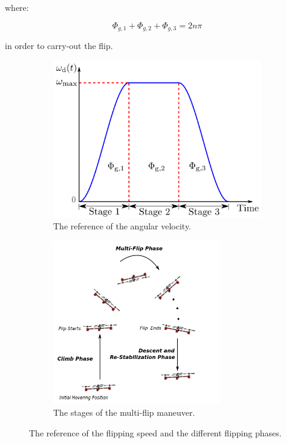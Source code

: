 \documentclass{thesisreport}
\begin{document}
\begin{enumerate}
where: 

\begin{equation}
	\Phi_{g,1} + \Phi_{g,2} + \Phi_{g,3} = 2 n \pi 
\end{equation}

in order to carry-out the flip.

\begin{figure}[h]
     \centering
     \begin{subfigure}[b]{0.45\textwidth}
         \centering
         \includegraphics[width=\textwidth]{Images/Flip/Closed_Loop_a}
         \caption{The reference of the angular velocity.}
         \label{closed_loop_a}
     \end{subfigure}
     \hfill
     \begin{subfigure}[b]{0.45\textwidth}
         \centering
         \includegraphics[width=0.8\textwidth]{Images/Flip/Closed_Loop_b}
         \caption{The stages of the multi-flip maneuver.}
         \label{closed_loop_b}
     \end{subfigure}
        \caption{The reference of the flipping speed and the different flipping phases. \cite{Chen2016}}
        \label{closed_loop_c}
\end{figure}


\end{enumerate}
\end{document}
